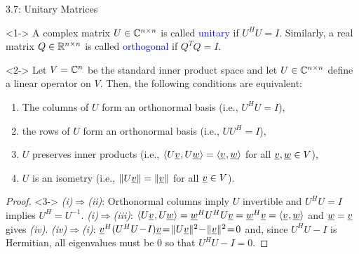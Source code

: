 \documentclass[10pt,english,aspectratio=169]{beamer}
\begin{document}
\begin{frame}[shrink=2]{3.7: Unitary Matrices}

\vspace{-1.5mm}

\begin{definition}<1->
A complex matrix $U\in \mathbb{C}^{n\times n}$ is called \textcolor{blue}{unitary} if $U^H U = I$.
Similarly, a real matrix $Q\in \mathbb{R}^{n\times n}$ is called \textcolor{blue}{orthogonal} if $Q^T Q = I$.
\end{definition}

\vspace{-1.5mm}

\begin{theorem}<2->
Let $V = \mathbb{C}^n$ be the standard inner product space and let  $U\in \mathbb{C}^{n\times n}$ define a linear operator on $V$.
Then, the following conditions are equivalent:
\begin{enumerate}
\setlength\itemsep{0.5mm}
\item[(i)] The columns of $U$ form an orthonormal basis (i.e.,  $U^H U = I$),
\item[(ii)] the rows of $U$ form an orthonormal basis (i.e.,  $U U^H = I$),
\item[(iii)] $U$ preserves inner products (i.e., ${\langle  U \underline{v}  \mskip1mu ,  U \underline{w}  \rangle} = {\langle  \underline{v}  \mskip1mu ,  \underline{w}  \rangle}$ for all $\underline{v},\underline{w}\in V$),
\item[(iv)] $U$ is an isometry (i.e., $\| U \underline{v} \| = \| \underline{v}\|$ for all $\underline{v} \in V$).
\end{enumerate}
\end{theorem}

\vspace{-1.5mm}

\begin{proof}<3->
{\it(i)}$\Rightarrow${\it(ii)}: Orthonormal columns imply $U$ invertible and $U^H U = I$ implies $U^H = U^{-1}$.
{\it(i)}$\Rightarrow${\it(iii)}: ${\langle  U \underline{v}  \mskip1mu ,  U \underline{w}  \rangle} = \underline{w}^H U^H U \underline{v} = \underline{w}^H \underline{v} = {\langle  \underline{v}  \mskip1mu ,  \underline{w}  \rangle}$ and $\underline{w}=\underline{v}$ gives {\it(iv)}.
{\it(iv)}$\Rightarrow${\it(i)}:
$\vecnot{v}^H (U^H U \!-\! I) \vecnot{v} \!=\! \| U \vecnot{v} \|^2 \!-\! \| \vecnot{v} \|^2 \!=\! 0$
and, since $U^H U \!-\! I$ is Hermitian, all eigenvalues must be 0 so that $U^H U - I = 0$.
\end{proof}

\end{frame}
\end{document}
